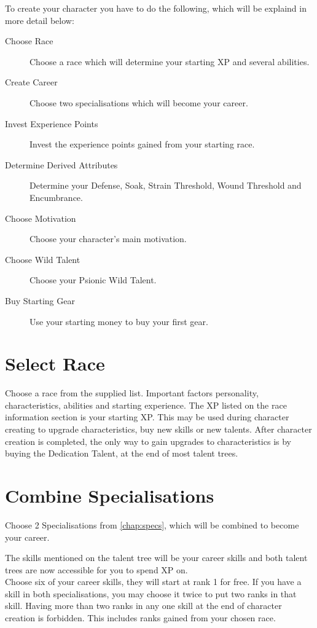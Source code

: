 \begin{multicols}{2}

To create your character you have to do the following, which will be explaind in more detail below:

\begin{description}
    \item [Choose Race] Choose a race which will determine your starting XP and several abilities.
    \item [Create Career] Choose two specialisations which will become your career.
    \item [Invest Experience Points] Invest the experience points gained from your starting race.
    \item [Determine Derived Attributes] Determine your Defense, Soak, Strain Threshold, Wound Threshold and Encumbrance.
    \item [Choose Motivation] Choose your character's main motivation.
    \item [Choose Wild Talent] Choose your Psionic Wild Talent.
    \item [Buy Starting Gear] Use your starting money to buy your first gear.
\end{description}

\section{Select Race}
Choose a race from the supplied list. Important factors personality, characteristics, abilities and starting experience.
The XP listed on the race information section is your starting XP. This may be used during character creating to upgrade characteristics, buy new skills or new talents.
After character creation is completed, the only way to gain upgrades to characteristics is by buying the Dedication Talent, at the end of most talent trees.

\section{Combine Specialisations}
Choose 2 Specialisations from \cref{chap:specs}, which will be combined to become your career.

The skills mentioned on the talent tree will be your career skills and both talent
trees are now accessible for you to spend XP on.\\
Choose six of your career skills, they will start at rank 1 for free. If you have
a skill in both specialisations, you may choose it twice to put two ranks in that
skill. Having more than two ranks in any one skill at the end of character creation
is forbidden. This includes ranks gained from your chosen race.


\end{multicols}
